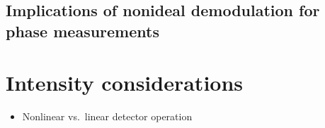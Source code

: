 \subsection{Implications of nonideal demodulation for phase measurements}


\section{Intensity considerations}
\begin{itemize}
  \item Nonlinear vs.\ linear detector operation
\end{itemize}




